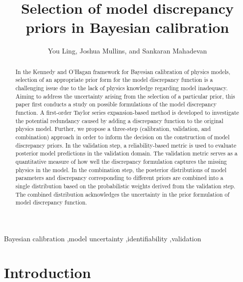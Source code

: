 \documentclass[preprint,review,12pt,3p]{elsarticle}
\begin{document}
\begin{frontmatter}
\title{Selection of model discrepancy priors in Bayesian calibration}
\author{You Ling, Joshua Mullins, and Sankaran Mahadevan}
\address{Department of Civil and Environmental Engineering, Vanderbilt University, TN 37235}

\begin{abstract}
In the Kennedy and O'Hagan framework for Bayesian calibration of physics models, selection of an appropriate prior form for the model discrepancy function is a challenging issue due to the lack of physics knowledge regarding model inadequacy. Aiming to address the uncertainty arising from the selection of a particular prior, this paper first conducts a study on possible formulations of the model discrepancy function. A first-order Taylor series expansion-based method is developed to investigate the potential redundancy caused by adding a discrepancy function to the original physics model. Further, we propose a three-step (calibration, validation, and combination) approach in order to inform the decision on the construction of model discrepancy priors. In the validation step, a reliability-based metric is used to evaluate posterior model predictions in the validation domain. The validation metric serves as a quantitative measure of how well the discrepancy formulation captures the missing physics in the model. In the combination step, the posterior distributions of model parameters and discrepancy corresponding to different priors are combined into a single distribution based on the probabilistic weights derived from the validation step. The combined distribution acknowledges the uncertainty in the prior formulation of model discrepancy function.
\end{abstract}

\begin{keyword}
Bayesian calibration \sep  model uncertainty \sep  identifiability \sep  validation 
\end{keyword}

\end{frontmatter}

\section{Introduction}\label{section:introduction}
\end{document}
